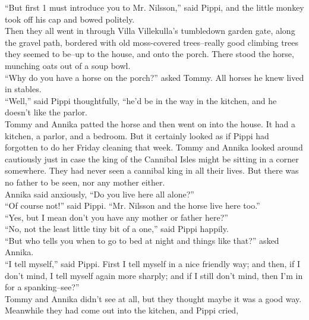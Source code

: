\documentclass{standard}
\begin{document}
``But first 1 must introduce you to Mr. Nilsson,” said Pippi, and the little monkey took off his cap and bowed politely.\\

Then they all went in through Villa Villekulla’s tumbledown garden gate, along the gravel path, bordered with old moss-covered trees--really good climbing trees they seemed to be--up to the house, and onto the porch. There stood the horse, munching oats out of a soup bowl.\\

``Why do you have a horse on the porch?” asked Tommy. All horses he knew lived in stables.\\

``Well,” said Pippi thoughtfully, “he’d be in the way in the kitchen, and he doesn’t like the parlor.\\

Tommy and Annika patted the horse and then went on into the house. It had a kitchen, a parlor, and a bedroom. But it certainly looked as if Pippi had forgotten to do her Friday cleaning that week. Tommy and Annika looked around cautiously just in case the king of the Cannibal Isles might be sitting in a corner somewhere. They had never seen a cannibal king in all their lives. But there was no father to be seen, nor any mother either.\\

Annika said anxiously, ``Do you live here all alone?”\\

``Of course not!” said Pippi. ``Mr. Nilsson and the horse live here too.”\\

``Yes, but I mean don’t you have any mother or father here?”\\

``No, not the least little tiny bit of a one,” said Pippi happily.\\

``But who tells you when to go to bed at night and things like that?” asked Annika.\\

``I tell myself,” said Pippi. First I tell myself in a nice friendly way; and then, if I don’t mind, I tell myself again more sharply; and if I still don’t mind, then I’m in for a spanking--see?”\\

Tommy and Annika didn’t see at all, but they thought maybe it was a good way. Meanwhile they had come out into the kitchen, and Pippi cried,\\
\end{document}
